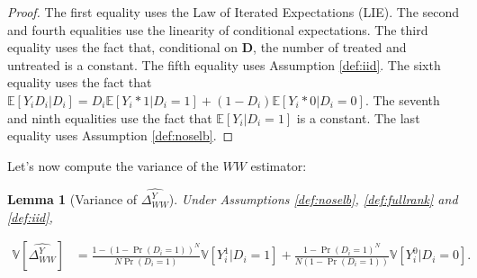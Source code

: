 \documentclass[
]{book}
\newcommand{\esp}[1]{\mathbb{E}[ #1 ]}
\newcommand{\var}[1]{\mathbb{V}[ #1 ]}
\newtheorem{lemma}{Lemma}[chapter]
\theoremstyle{definition}
\theoremstyle{definition}
\theoremstyle{definition}
\theoremstyle{definition}
\theoremstyle{remark}
\begin{document}
\begin{proof}
The first equality uses the Law of Iterated Expectations (LIE).
The second and fourth equalities use the linearity of conditional expectations.
The third equality uses the fact that, conditional on \(\mathbf{D}\), the number of treated and untreated is a constant.
The fifth equality uses Assumption \ref{def:iid}.
The sixth equality uses the fact that \(\esp{Y_iD_i|D_i}=D_i\esp{Y_i*1|D_i=1}+(1-D_i)\esp{Y_i*0|D_i=0}\).
The seventh and ninth equalities use the fact that \(\esp{Y_i|D_i=1}\) is a constant.
The last equality uses Assumption \ref{def:noselb}.
\end{proof}

Let's now compute the variance of the \(WW\) estimator:

\begin{lemma}[Variance of $\hat{\Delta^Y_{WW}}$]
\protect\hypertarget{lem:varww}{}{\label{lem:varww} \iffalse (Variance of \(\hat{\Delta^Y_{WW}}\)) \fi{} }Under Assumptions \ref{def:noselb}, \ref{def:fullrank} and \ref{def:iid},

\begin{align*}
\var{{\hat{\Delta^Y_{WW}}}} & = \frac{1-(1-\Pr(D_i=1))^N}{N\Pr(D_i=1)}\var{Y_i^1|D_i=1}+\frac{1-\Pr(D_i=1)^N}{N(1-\Pr(D_i=1))}\var{Y_i^0|D_i=0}.
\end{align*}
\end{lemma}
\end{document}
